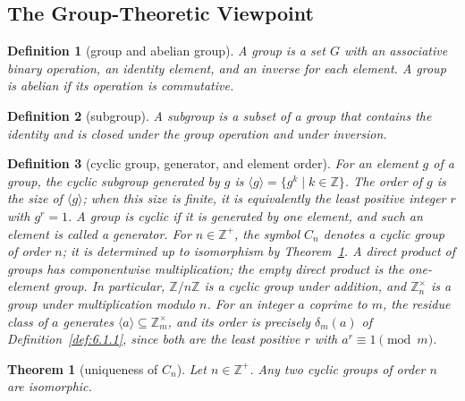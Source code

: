 \documentclass[11pt]{article}
\theoremstyle{ntstyle}
\newtheorem{theorem}{Theorem}[subsection]
\newtheorem{definition}{Definition}[subsection]
\newcommand{\ZmodUnits}[1]{\mathbb{Z}_{#1}^{\times}}
\begin{document}
\subsection{The Group-Theoretic Viewpoint}\label{subsec:6.6}

\begin{definition}[group and abelian group]\label{def:6.6.1}\label{def:group-and-abelian-group}
  A group is a set $G$ with an associative binary operation, an identity
  element, and an inverse for each element. A group is abelian if its
  operation is commutative.

\end{definition}

\begin{definition}[subgroup]\label{def:6.6.2}\label{def:subgroup}
  A subgroup is a subset of a group that contains the identity and is
  closed under the group operation and under inversion.

\end{definition}

\begin{definition}[cyclic group, generator, and element order]\label{def:6.6.3}\label{def:cyclic-group-generator-and-element-order}
  For an element $g$ of a group, the cyclic subgroup generated by $g$ is
  $\langle g\rangle=\{g^k\mid k\in\mathbb{Z}\}$. The order of $g$ is the
  size of $\langle g\rangle$; when this size is finite, it is equivalently
  the least positive integer $r$ with $g^r=1$. A group is cyclic if it is
  generated by one element, and such an element is called a generator.
  For $n\in\mathbb{Z}^+$, the symbol $C_n$ denotes a cyclic group of order $n$;
  it is determined up to isomorphism by Theorem~\ref{thm:6.6.1}.
  A direct product of groups has componentwise multiplication; the empty
  direct product is the one-element group.
  In particular, $\mathbb{Z}/n\mathbb{Z}$ is a cyclic group under addition,
  and $\ZmodUnits{n}$ is a group under multiplication modulo $n$. For an
  integer $a$ coprime to $m$, the residue class of $a$ generates
  $\langle a\rangle\subseteq\ZmodUnits{m}$, and its order is precisely
  $\delta_m(a)$ of Definition~\ref{def:6.1.1}, since both are the least
  positive $r$ with $a^r\equiv1\pmod{m}$.

\end{definition}

\begin{theorem}[uniqueness of $C_n$]\label{thm:6.6.1}\label{thm:uniqueness-of-c-n}
  Let $n\in\mathbb{Z}^+$. Any two cyclic groups of order $n$ are isomorphic.

\end{theorem}
\end{document}
